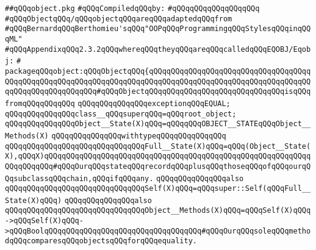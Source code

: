 \label{src/lib/src/object.pkg}
\verb|##qQQqobject.pkg|\newline
\newline
\verb|#qQQqCompiledqQQqby:|\newline
\verb|#qQQqqQQqqQQqqQQqqQQq|\newline
\newline
\verb|#qQQqObjectqQQq/qQQqobjectqQQqareqQQqadaptedqQQqfrom|\newline
\verb|#qQQqBernardqQQqBerthomieu'sqQQq"OOPqQQqProgrammingqQQqStylesqQQqinqQQqML"|\newline
\verb|#qQQqAppendixqQQq2.3.2qQQqwhereqQQqtheyqQQqareqQQqcalledqQQqEQOBJ/Eqobj:|\newline
\verb|#|\newline
\verb|packageqQQqobject:qQQqObjectqQQq{qQQqqQQqqQQqqQQqqQQqqQQqqQQqqQQqqQQqqQQqqQQqqQQqqQQqqQQqqQQqqQQqqQQqqQQqqQQqqQQqqQQqqQQqqQQqqQQqqQQqqQQqqQQqqQQqqQQqqQQqqQQqqQQq#qQQqObjectqQQqqQQqqQQqqQQqqQQqqQQqqQQqqQQqisqQQqfromqQQqqQQqqQQq|\newline
\newline
\verb|qQQqqQQqqQQqqQQqexceptionqQQqEQUAL;|\newline
\newline
\verb|qQQqqQQqqQQqqQQqclass__qQQqsuperqQQq=qQQqroot_object;|\newline
\newline
\verb|qQQqqQQqqQQqqQQqObject__State(X)qQQq=qQQqqQQqOBJECT__STATEqQQqObject__Methods(X)|\newline
\verb|qQQqqQQqqQQqqQQqwithtypeqQQqqQQqqQQqqQQq|\newline
\verb|qQQqqQQqqQQqqQQqqQQqqQQqqQQqqQQqFull__State(X)qQQq=qQQq(Object__State(X),qQQqX)qQQqqQQqqQQqqQQqqQQqqQQqqQQqqQQqqQQqqQQqqQQqqQQqqQQqqQQqqQQqqQQqqQQqqQQq#qQQqOurqQQqstateqQQqrecordqQQqplusqQQqthoseqQQqofqQQqourqQQqsubclassqQQqchain,qQQqifqQQqany.|\newline
\verb|qQQqqQQqqQQqqQQqalso|\newline
\verb|qQQqqQQqqQQqqQQqqQQqqQQqqQQqqQQqSelf(X)qQQq=qQQqsuper::Self(qQQqFull__State(X)qQQq)|\newline
\verb|qQQqqQQqqQQqqQQqalso|\newline
\verb|qQQqqQQqqQQqqQQqqQQqqQQqqQQqqQQqObject__Methods(X)qQQq=qQQqSelf(X)qQQq->qQQqSelf(X)qQQq->qQQqBoolqQQqqQQqqQQqqQQqqQQqqQQqqQQqqQQqqQQq#qQQqOurqQQqsoleqQQqmethodqQQqcomparesqQQqobjectsqQQqforqQQqequality.|\newline
